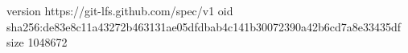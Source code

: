 version https://git-lfs.github.com/spec/v1
oid sha256:de83e8c11a43272b463131ae05dfdbab4c141b30072390a42b6cd7a8e33435df
size 1048672

